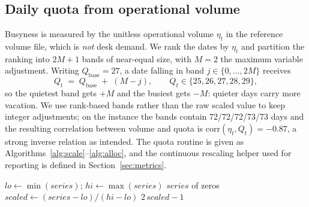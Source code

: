 \documentclass[preprint,12pt]{elsarticle}
\begin{document}
   \subsection{Daily quota from operational volume}
   Busyness is measured by the unitless operational volume $\eta_t$ in the reference volume file, which is \emph{not} desk demand. We rank the dates by $\eta_t$ and partition the ranking into $2M+1$ bands of near-equal size, with $M=2$ the maximum variable adjustment. Writing $Q_{\text{base}}=27$, a date falling in band $j\in\{0,\dots,2M\}$ receives
   \begin{equation}
      Q_t \;=\; Q_{\text{base}} \;+\; (M - j), \qquad Q_t \in \{25, 26, 27, 28, 29\},
   \end{equation}
   so the quietest band gets $+M$ and the busiest gets $-M$: quieter days carry more vacation. We use rank-based bands rather than the raw scaled value to keep integer adjustments; on the instance the bands contain 72/72/72/73/73 days and the resulting correlation between volume and quota is $\mathrm{corr}(\eta_t, Q_t) = -0.87$, a strong inverse relation as intended. The quota routine is given as Algorithms~\ref{alg:scale}--\ref{alg:alloc}, and the continuous rescaling helper used for reporting is defined in Section~\ref{sec:metrics}.

   \begin{algorithm}[h!]
      \caption{Rescale a series to $[-1,1]$.}
      \label{alg:scale}
      \begin{algorithmic}[1]
      \State $lo \gets \min(series)$; $hi \gets \max(series)$
         \State \Return $series$ of zeros
      \EndIf
      \State $scaled \gets (series - lo)/(hi - lo)$ 
      \State \Return $2\,scaled - 1$ 
      \EndFunction
      \end{algorithmic}
   \end{algorithm}
\end{document}
